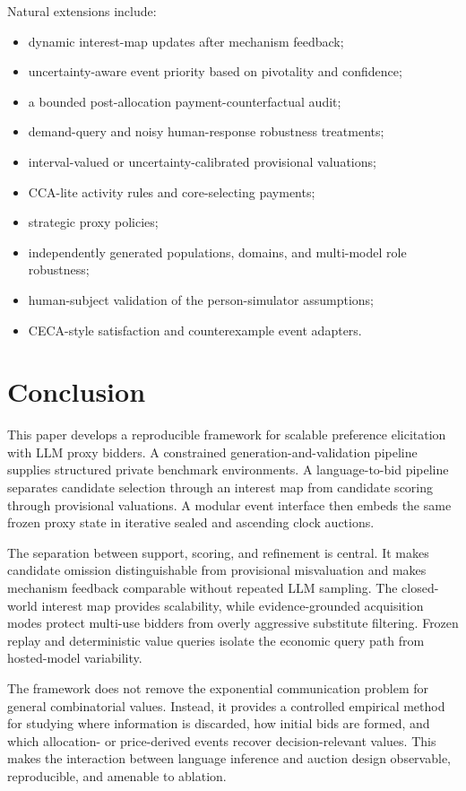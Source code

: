 Natural extensions include:
\begin{itemize}[leftmargin=*]
    \item dynamic interest-map updates after mechanism feedback;
    \item uncertainty-aware event priority based on pivotality and confidence;
    \item a bounded post-allocation payment-counterfactual audit;
    \item demand-query and noisy human-response robustness treatments;
    \item interval-valued or uncertainty-calibrated provisional valuations;
    \item CCA-lite activity rules and core-selecting payments;
    \item strategic proxy policies;
    \item independently generated populations, domains, and multi-model role robustness;
    \item human-subject validation of the person-simulator assumptions;
    \item CECA-style satisfaction and counterexample event adapters.
\end{itemize}

\section{Conclusion}

This paper develops a reproducible framework for scalable preference
elicitation with LLM proxy bidders. A constrained generation-and-validation
pipeline supplies structured private benchmark environments. A
language-to-bid pipeline separates candidate selection through an interest
map from candidate scoring through provisional valuations. A modular event
interface then embeds the same frozen proxy state in iterative sealed and
ascending clock auctions.

The separation between support, scoring, and refinement is central. It makes
candidate omission distinguishable from provisional misvaluation and makes
mechanism feedback comparable without repeated LLM sampling. The
closed-world interest map provides scalability, while evidence-grounded
acquisition modes protect multi-use bidders from overly aggressive
substitute filtering. Frozen replay and deterministic value queries isolate
the economic query path from hosted-model variability.

The framework does not remove the exponential communication problem for
general combinatorial values. Instead, it provides a controlled empirical
method for studying where information is discarded, how initial bids are
formed, and which allocation- or price-derived events recover
decision-relevant values. This makes the interaction between language
inference and auction design observable, reproducible, and amenable to
ablation.

